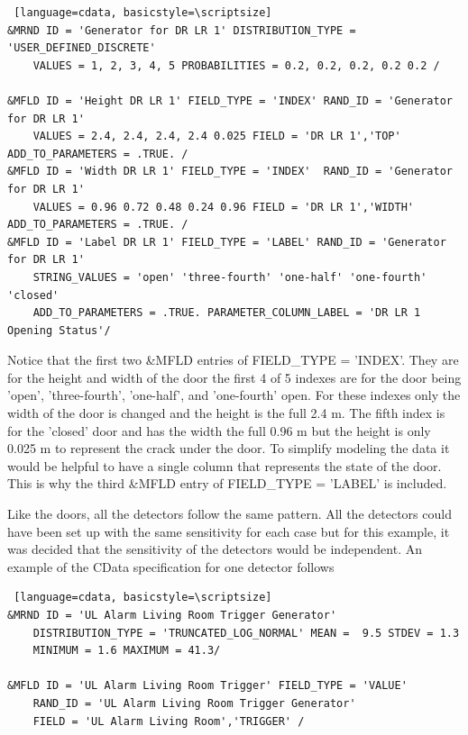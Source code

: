 \documentclass[12pt,twoside]{book}
\begin{document}
\vspace{\baselineskip}
\begin{lstlisting} [language=cdata, basicstyle=\scriptsize]
&MRND ID = 'Generator for DR LR 1' DISTRIBUTION_TYPE = 'USER_DEFINED_DISCRETE'
    VALUES = 1, 2, 3, 4, 5 PROBABILITIES = 0.2, 0.2, 0.2, 0.2 0.2 /

&MFLD ID = 'Height DR LR 1' FIELD_TYPE = 'INDEX' RAND_ID = 'Generator for DR LR 1'
    VALUES = 2.4, 2.4, 2.4, 2.4 0.025 FIELD = 'DR LR 1','TOP' ADD_TO_PARAMETERS = .TRUE. /
&MFLD ID = 'Width DR LR 1' FIELD_TYPE = 'INDEX'  RAND_ID = 'Generator for DR LR 1'
    VALUES = 0.96 0.72 0.48 0.24 0.96 FIELD = 'DR LR 1','WIDTH' ADD_TO_PARAMETERS = .TRUE. /
&MFLD ID = 'Label DR LR 1' FIELD_TYPE = 'LABEL' RAND_ID = 'Generator for DR LR 1'
    STRING_VALUES = 'open' 'three-fourth' 'one-half' 'one-fourth' 'closed'
    ADD_TO_PARAMETERS = .TRUE. PARAMETER_COLUMN_LABEL = 'DR LR 1 Opening Status'/
\end{lstlisting}

Notice that the first two  {\ct \&MFLD} entries of  {\ct FIELD\_TYPE = 'INDEX'}. They are for the height and width of the door the first 4 of 5 indexes are for the door being 'open', 'three-fourth', 'one-half', and  'one-fourth' open. For these indexes only the width of the door is changed and the height is the full 2.4 m. The fifth index is for the 'closed' door and has the width the full 0.96 m but the height is only 0.025 m to represent the crack under the door. To simplify modeling the data it would be helpful to have a single column that represents the state of the door. This is why the third {\ct \&MFLD} entry of {\ct FIELD\_TYPE = 'LABEL'} is included.

Like the doors, all the detectors follow the same pattern. All the detectors could have been set up with the same sensitivity for each case but for this example, it was decided that the sensitivity of the detectors would be independent. An example of the CData specification for one detector follows

\vspace{\baselineskip}
\begin{lstlisting} [language=cdata, basicstyle=\scriptsize]
&MRND ID = 'UL Alarm Living Room Trigger Generator'
    DISTRIBUTION_TYPE = 'TRUNCATED_LOG_NORMAL' MEAN =  9.5 STDEV = 1.3
    MINIMUM = 1.6 MAXIMUM = 41.3/

&MFLD ID = 'UL Alarm Living Room Trigger' FIELD_TYPE = 'VALUE'
    RAND_ID = 'UL Alarm Living Room Trigger Generator'
    FIELD = 'UL Alarm Living Room','TRIGGER' /
\end{lstlisting}
\end{document}
